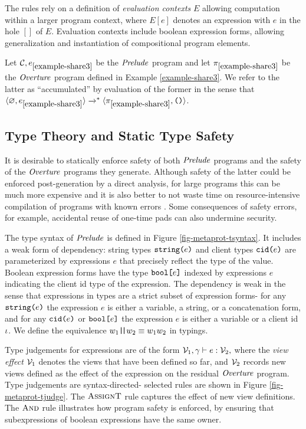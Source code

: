 The rules rely on a definition of \emph{evaluation contexts} $E$
allowing computation within a larger program context, where $E[e]$
denotes an expression with $e$ in the hole $[]$ of $E$. Evaluation
contexts include boolean expression forms, allowing generalization
and instantiation of compositional program elements.
\begin{example}
  \label{example-share3-eval}
  Let $\mathcal{C},e_{\ref{example-share3}}$ be the $\mathit{Prelude}$ program and let 
  $\pi_{\ref{example-share3}}$ be the  $\mathit{Overture}$ program defined
  in Example \ref{example-share3}. We refer to the latter as ``accumulated''
  by evaluation of the former in the sense that $\langle \varnothing,e_{\ref{example-share3}} \rangle
  \xrightarrow{}^{*} \langle \pi_{\ref{example-share3}},\texttt{()} \rangle$.
\end{example}

\subsection{Type Theory and Static Type Safety}

It is desirable to statically enforce safety of both $\mathit{Prelude}$
programs and the safety of the $\mathit{Overture}$ programs they
generate. Although safety of the latter could be enforced
post-generation by a direct analysis, for large programs this can be
much more expensive and it is also better to not waste time on
resource-intensive compilation of programs with known errors
\cite{kreuter2012billion}. Some consequences of safety errors, for example, accidental
reuse of one-time pads can also undermine security.

The type syntax of $\mathit{Prelude}$ is defined in Figure
\ref{fig-metaprot-tsyntax}. It includes a weak form of dependency:
string types $\texttt{string(}e\texttt{)}$ and client types $\texttt{cid(}e\texttt{)}$
are parameterized by expressions $e$ that precisely reflect the
type of the value. Boolean expression forms have the type
$\texttt{bool[}e\texttt{]}$ indexed by expressions $e$ indicating the client
id type of the expression. The dependency is weak in the
sense that expressions in types are a strict subset of
expression forms- for any $\texttt{string(}e\texttt{)}$ the expression $e$
is either a variable, a string, or a concatenation form,
and for any $\texttt{cid(}e\texttt{)}$ or $\texttt{bool[}e\texttt{]}$ the expression $e$
is either a variable or a client id $\iota$. We define
the equivalence $w_1 \texttt{|\!|} w_2 \equiv w_1w_2$ in typings. 

Type judgements for expressions are of the form
$\tjudge{\viewst_1}{\gamma}{e}{\viewst_2}$ where the \emph{view
effect} $\mathcal{V}_1$ denotes the views that have been defined so far,
and $\mathcal{V}_2$ records new views defined as the effect of the
expression on the residual $\mathit{Overture}$ program.  Type judgements are
syntax-directed- selected rules are shown in Figure
\ref{fig-metaprot-tjudge}. The $\text{\sc AssignT}$ rule
captures the effect of new view definitions. The
$\text{\sc And}$ rule illustrates how program safety is enforced,
by ensuring that subexpressions of boolean expressions have the
same owner.

